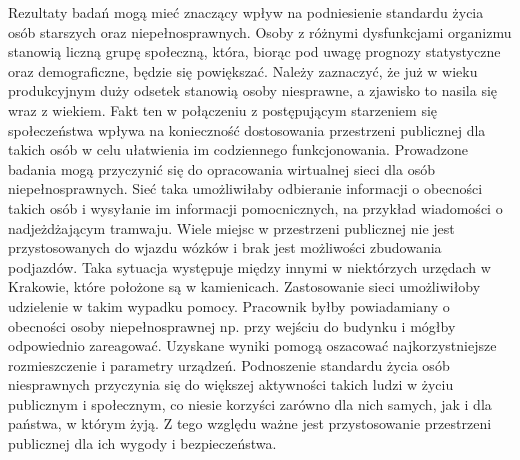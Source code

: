 \documentclass[a4paper]{article}
\begin{document}
Rezultaty badań mogą mieć znaczący wpływ na podniesienie standardu życia osób starszych oraz niepełnosprawnych. Osoby z różnymi dysfunkcjami organizmu stanowią liczną grupę społeczną, która, biorąc pod uwagę prognozy statystyczne oraz demograficzne, będzie się powiększać. Należy zaznaczyć, że już w wieku produkcyjnym duży odsetek stanowią osoby niesprawne, a zjawisko to nasila się wraz z wiekiem. Fakt ten w połączeniu z postępującym starzeniem się społeczeństwa wpływa na konieczność dostosowania przestrzeni publicznej dla takich osób w celu ułatwienia im codziennego funkcjonowania. Prowadzone badania mogą przyczynić się do opracowania wirtualnej sieci dla osób niepełnosprawnych. Sieć taka umożliwiłaby odbieranie informacji o obecności takich osób i wysyłanie im informacji pomocnicznych, na przykład wiadomości o nadjeżdżającym tramwaju. Wiele miejsc w przestrzeni publicznej nie jest przystosowanych do wjazdu wózków i brak jest możliwości zbudowania podjazdów. Taka sytuacja występuje między innymi w niektórzych urzędach w Krakowie, które położone są w kamienicach. Zastosowanie sieci umożliwiłoby udzielenie w takim wypadku pomocy. Pracownik byłby powiadamiany o obecności osoby niepełnosprawnej np. przy wejściu do budynku i mógłby odpowiednio zareagować. Uzyskane wyniki pomogą oszacować najkorzystniejsze rozmieszczenie i parametry urządzeń. Podnoszenie standardu życia osób niesprawnych przyczynia się do większej aktywności takich ludzi w życiu publicznym i społecznym, co niesie korzyści zarówno dla nich samych, jak i dla państwa, w którym żyją. Z tego względu ważne jest przystosowanie przestrzeni publicznej dla ich wygody i bezpieczeństwa.
\end{document}
